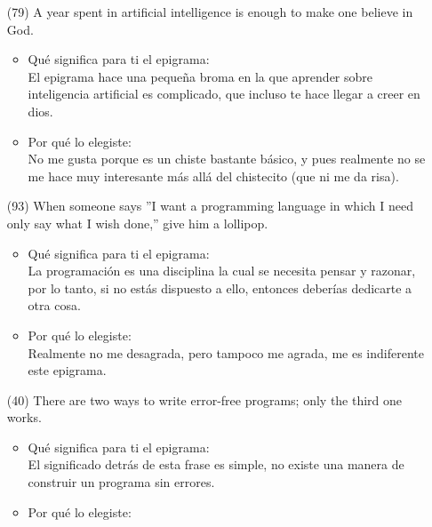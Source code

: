 \documentclass{article}
\begin{document}
\begin{itemize}
\begin{itemize}
    \end{itemize}
    \item[(79)]A year spent in artificial intelligence is enough to make one believe in God.
    \begin{itemize}
        \item Qué significa para ti el epigrama:\\
        El epigrama hace una pequeña broma en la que aprender sobre inteligencia artificial es complicado, que incluso te hace llegar a creer en dios.
        \item Por qué lo elegiste:\\
        No me gusta porque es un chiste bastante básico, y pues realmente no se me hace muy interesante más allá del chistecito (que ni me da risa).
    \end{itemize}
    \item[(93)]When someone says ”I want a programming language in which I need only say what I wish done,” give him a lollipop.
    \begin{itemize}
        \item Qué significa para ti el epigrama:\\
        La programación es una disciplina la cual se necesita pensar y razonar, por lo tanto, si no estás dispuesto a ello, entonces deberías dedicarte a otra cosa.
        \item Por qué lo elegiste:\\
        Realmente no me desagrada, pero tampoco me agrada, me es indiferente este epigrama.
    \end{itemize}
    \item[(40)]There are two ways to write error-free programs; only the third one works.
    \begin{itemize}
        \item Qué significa para ti el epigrama:\\
        El significado detrás de esta frase es simple, no existe una manera de construir un programa sin errores.
        \item Por qué lo elegiste:\\

\end{itemize}
\end{itemize}
\end{document}
